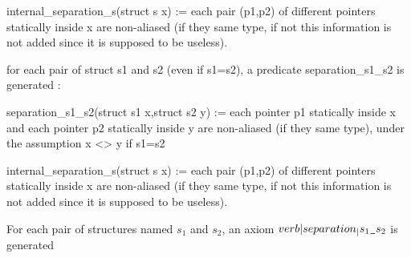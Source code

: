 internal_separation_s(struct s x) := 
  each pair (p1,p2) of different pointers statically
  inside x are non-aliased (if they same type, if not this information
  is not added since it is supposed to be useless).

for each pair of struct s1 and s2 (even if s1=s2), a predicate
separation_s1_s2 is generated :

separation_s1_s2(struct s1 x,struct s2 y) := 
  each pointer p1 statically inside x and each
  pointer p2 statically inside y are non-aliased (if they same type),
  under the assumption x <> y if s1=s2

  

internal_separation_s(struct s x) := 
  each pair (p1,p2) of different pointers statically
  inside x are non-aliased (if they same type, if not this information
  is not added since it is supposed to be useless).







For each pair of structures named $s_1$ and $s_2$, an axiom 
$verb|separation_|s_1\verb|_|s_2$ is generated